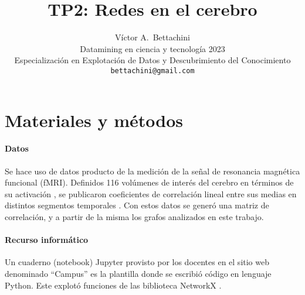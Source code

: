 \documentclass{article}
\title{TP2: Redes en el cerebro}
\author{
  Víctor A.~Bettachini\\ %
  Datamining en ciencia y tecnología 2023\\
  Especialización en Explotación de Datos y Descubrimiento del Conocimiento\\
  \texttt{bettachini@gmail.com}
}
\begin{document}
\maketitle







\section{Materiales y métodos}

\paragraph{Datos}
Se hace uso de datos producto de la medición de la señal de resonancia magnética funcional (fMRI).
Definidos 116 volúmenes de interés del cerebro en términos de su activación \cite{tzourio-mazoyer_automated_2002}, se publicaron coeficientes de correlación lineal entre sus medias en distintos segmentos temporales \cite{tagliazucchi_large-scale_2013}.
Con estos datos se generó una matriz de correlación, y a partir de la misma los grafos analizados en este trabajo.


\paragraph{Recurso informático} 
Un cuaderno (notebook) Jupyter provisto por los docentes en el sitio web denominado ``Campus'' \cite{kamienkowski_curso_2023} es la plantilla donde se escribió código en lenguaje Python.
Este explotó funciones de las biblioteca NetworkX \cite{hagberg_exploring_2008}.
\end{document}
